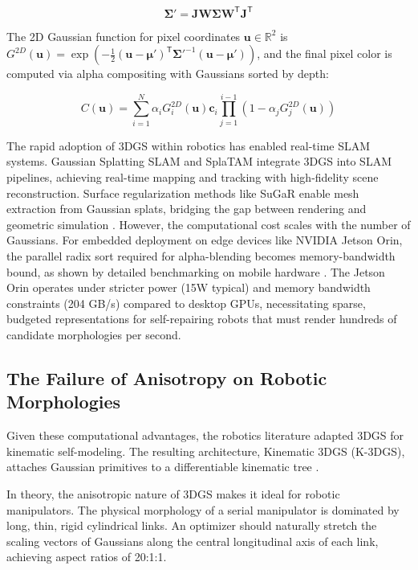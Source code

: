 \documentclass[12pt,a4paper,oneside]{report}
\begin{document}
\begin{equation}
\boldsymbol{\Sigma}' = \mathbf{J} \mathbf{W} \boldsymbol{\Sigma} \mathbf{W}^\mathsf{T} \mathbf{J}^\mathsf{T}
\end{equation}

The 2D Gaussian function for pixel coordinates $\mathbf{u} \in \mathbb{R}^2$ is $G^{2D}(\mathbf{u}) = \exp\left(-\frac{1}{2} (\mathbf{u} - \boldsymbol{\mu}')^\mathsf{T} \boldsymbol{\Sigma}'^{-1} (\mathbf{u} - \boldsymbol{\mu}')\right)$, and the final pixel color is computed via alpha compositing with Gaussians sorted by depth:

\begin{equation}
C(\mathbf{u}) = \sum_{i=1}^{N} \alpha_i G_i^{2D}(\mathbf{u}) \mathbf{c}_i \prod_{j=1}^{i-1} (1 - \alpha_j G_j^{2D}(\mathbf{u}))
\end{equation}

The rapid adoption of 3DGS within robotics has enabled real-time SLAM systems. Gaussian Splatting SLAM \cite{matsuki2024gaussian} and SplaTAM \cite{keetha2024splattam} integrate 3DGS into SLAM pipelines, achieving real-time mapping and tracking with high-fidelity scene reconstruction. Surface regularization methods like SuGaR enable mesh extraction from Gaussian splats, bridging the gap between rendering and geometric simulation \cite{guedon2024sugar}. However, the computational cost scales with the number of Gaussians. For embedded deployment on edge devices like NVIDIA Jetson Orin, the parallel radix sort required for alpha-blending becomes memory-bandwidth bound, as shown by detailed benchmarking on mobile hardware \cite{lassanske2024gaurast}. The Jetson Orin operates under stricter power (15W typical) and memory bandwidth constraints (204 GB/s) compared to desktop GPUs, necessitating sparse, budgeted representations for self-repairing robots that must render hundreds of candidate morphologies per second.

\subsection{The Failure of Anisotropy on Robotic Morphologies}

Given these computational advantages, the robotics literature adapted 3DGS for kinematic self-modeling. The resulting architecture, Kinematic 3DGS (K-3DGS), attaches Gaussian primitives to a differentiable kinematic tree \cite{hu2025learning}.

In theory, the anisotropic nature of 3DGS makes it ideal for robotic manipulators. The physical morphology of a serial manipulator is dominated by long, thin, rigid cylindrical links. An optimizer should naturally stretch the scaling vectors of Gaussians along the central longitudinal axis of each link, achieving aspect ratios of 20:1:1.
\end{document}
